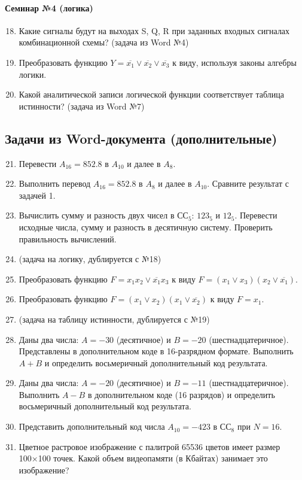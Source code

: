 \documentclass[a4paper,14pt]{report}
\begin{document}
\paragraph{Семинар №4 (логика)}
\begin{enumerate}
    \setcounter{enumi}{17}
    \item Какие сигналы будут на выходах S, Q, R при заданных входных сигналах комбинационной схемы? (задача из Word №4)
    \item Преобразовать функцию $Y = \overline{x_1} \vee \overline{x_2} \vee \overline{x_3}$ к виду, используя законы алгебры логики.
    \item Какой аналитической записи логической функции соответствует таблица истинности? (задача из Word №7)
\end{enumerate}

\subsection*{Задачи из Word-документа (дополнительные)}
\begin{enumerate}
    \setcounter{enumi}{20}
    \item Перевести $A_{16}=852.8$ в $A_{10}$ и далее в $A_8$.
    \item Выполнить перевод $A_{16}=852.8$ в $A_8$ и далее в $A_{10}$. Сравните результат с задачей 1.
    \item Вычислить сумму и разность двух чисел в СС$_5$: $123_5$ и $12_5$. Перевести исходные числа, сумму и разность в десятичную систему. Проверить правильность вычислений.
    \item (задача на логику, дублируется с №18)
    \item Преобразовать функцию $F = x_1 x_2 \vee \overline{x_1} x_3$ к виду $F = (x_1 \vee x_3)(x_2 \vee \overline{x_1})$.
    \item Преобразовать функцию $F = (x_1 \vee x_2)(x_1 \vee \overline{x_2})$ к виду $F = x_1$.
    \item (задача на таблицу истинности, дублируется с №19)
    \item Даны два числа: $A=-30$ (десятичное) и $B=-20$ (шестнадцатеричное). Представлены в дополнительном коде в 16-разрядном формате. Выполнить $A+B$ и определить восьмеричный дополнительный код результата.
    \item Даны два числа: $A=-20$ (десятичное) и $B=-11$ (шестнадцатеричное). Выполнить $A-B$ в дополнительном коде (16 разрядов) и определить восьмеричный дополнительный код результата.
    \item Представить дополнительный код числа $A_{10}=-423$ в СС$_8$ при $N=16$.
    \item Цветное растровое изображение с палитрой 65536 цветов имеет размер 100×100 точек. Какой объем видеопамяти (в Кбайтах) занимает это изображение?
\end{enumerate}
\end{document}

